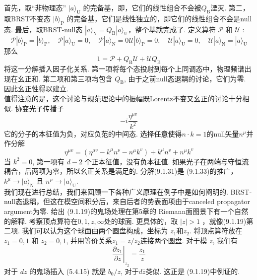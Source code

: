 首先，取“非物理态” $|a\rangle_{\mathrm{U}} $ 的完备基，即，它们的线性组合不会被$Q_{\mathrm{B}}$湮灭.
第二，取BRST不变态 $|b\rangle_{\mathrm{P}}$ 的完备基，它们是线性独立的，即它们的线性组合不会是null态.
最后，取BRST-null态 $|a\rangle_{\mathrm{N}}=Q_{\mathrm{B}}|a\rangle_{\mathrm{U}}$，整个基就完成了. 定义算符 $\mathscr{P}$ 和 $\mathscr{U}$ :
\begin{subequations}
\begin{equation}
		\mathscr{P}|b\rangle_{\mathrm{P}}=|b\rangle_{\mathrm{P}}, \quad \mathscr{P}|a\rangle_{\mathrm{U}}=0, \quad \mathscr{P}|a\rangle_{\mathrm{N}}=0 
\end{equation}
\begin{equation}
		\mathscr{U}|b\rangle_{\mathrm{P}}=0, \quad \mathscr{U}|a\rangle_{\mathrm{U}}=0, \quad \mathscr{U}|a\rangle_{\mathrm{N}}=|a\rangle_{\mathrm{U}}
\end{equation}
\end{subequations}
那么
\begin{equation}
	1=\mathscr{P}+Q_{\mathrm{B}} \mathscr{U}+\mathscr{U} Q_{\mathrm{B}}
\end{equation}
将这一分解插入因子化关系. 第一项将每个态投射到每个上同调态中，物理频谱出现在幺正和. 第二项和第三项均包含 $Q_{\mathrm{B}}$, 由于之前null态退耦的讨论，它们为零. 因此幺正性得以建立.\\
值得注意的是，这个讨论与规范理论中的振幅既Lorentz不变又幺正的讨论十分相似. 协变光子传播子
\begin{equation}
	-i \frac{\eta^{\mu v}}{k^{2}}
\end{equation}
它的分子的本征值为负，对应负范的中间态. 选择任意使得$n \cdot k=1$的null矢量$n^{\mu}$并作分解
\begin{equation}
	\eta^{\mu v}=\left(\eta^{\mu v}-k^{\mu} n^{\nu}-n^{\mu} k^{v}\right)+k^{\mu} n^{v}+n^{\mu} k^{v}
\end{equation}
当 $k^{2}=0$, 第一项有 $d-2$ 个正本征值，没有负本征值. 如果光子在两端与守恒流耦合，后两项为零，所以幺正关系是满足的. 分解(9.1.31)是 (9.1.33)的推广，$k^{\mu} \rightarrow|a\rangle_{\mathrm{N}}$ 且 $n^{\mu} \rightarrow|a\rangle_{\mathrm{U}}$.\\
我们现在进行总结，我们来回顾一下各种广义原理在例子中是如何阐明的. BRST-null态退耦，但这在模空间积分后，来自后者的势表面项由于canceled propagator argument为零. 给出 (9.1.19)的鬼场处理在第5章的 Riemann面图景下有一个自然的解释. 考察顶点算符在$0,1, z, \infty $处的球面. 更具体的，取 $|z|>1$ ，就像(9.1.19)第二项. 我们可以认为这个球面由两个圆盘构成，坐标为 $z_{1}$和$z_{2}$. 将顶点算符放在 $z_{1}=0,1$ 和 $z_{2}=0,1$, 并用等价关系$z_{1}=z / z_{2}$连接两个圆盘. 对于模 $z$, 我们有
\begin{equation}
	\left.\frac{\partial z_{1}}{\partial z}\right|_{z_{2}}=\frac{z_{1}}{z}
\end{equation}
对于 $d z$ 的鬼场插入 (5.4.15) 就是 $b_{0} / z$, 对于$d \bar{z}$类似. 这正是 (9.1.19)中例证的.


